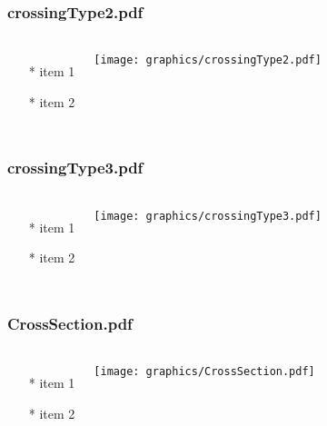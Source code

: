 \begin{frame} \frametitle{crossingType2.pdf}
    \begin{columns}[c]
        \begin{itemize}
            \item[*] item 1
            \item[*] item 2
        \end{itemize}
        \begin{minipage}{\linewidth}
            \begin{center}
            \texttt{[image: graphics/crossingType2.pdf]}
            \label{gfx:crossingType2.pdf}
            \end{center}
        \end{minipage}
    \end{columns}
\end{frame}
\begin{frame} \frametitle{crossingType3.pdf}
    \begin{columns}[c]
        \begin{itemize}
            \item[*] item 1
            \item[*] item 2
        \end{itemize}
        \begin{minipage}{\linewidth}
            \begin{center}
            \texttt{[image: graphics/crossingType3.pdf]}
            \label{gfx:crossingType3.pdf}
            \end{center}
        \end{minipage}
    \end{columns}
\end{frame}
\begin{frame} \frametitle{CrossSection.pdf}
    \begin{columns}[c]
        \begin{itemize}
            \item[*] item 1
            \item[*] item 2
        \end{itemize}
        \begin{minipage}{\linewidth}
            \begin{center}
            \texttt{[image: graphics/CrossSection.pdf]}
            \label{gfx:CrossSection.pdf}
            \end{center}
        \end{minipage}
    \end{columns}
\end{frame}
